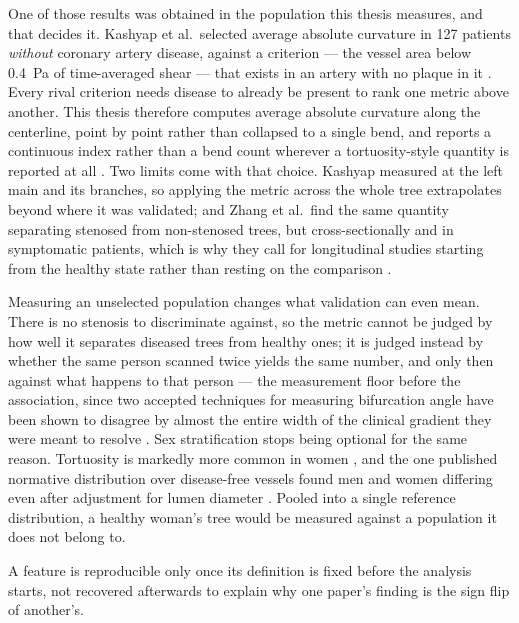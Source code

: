 One of those results was obtained in the population this thesis measures, and that decides it.
Kashyap et al.\ selected average absolute curvature in 127 patients \emph{without} coronary artery
disease, against a criterion --- the vessel area below 0.4~Pa of time-averaged shear --- that exists
in an artery with no plaque in it \cite{kashyap2022tortuosity}.
Every rival criterion needs disease to already be present to rank one metric above another.
This thesis therefore computes average absolute curvature along the centerline, point by point
rather than collapsed to a single bend, and reports a continuous index rather than a bend count
wherever a tortuosity-style quantity is reported at all \cite{zebicmihic2024index}.
Two limits come with that choice.
Kashyap measured at the left main and its branches, so applying the metric across the whole tree
extrapolates beyond where it was validated; and Zhang et al.\ find the same quantity separating
stenosed from non-stenosed trees, but cross-sectionally and in symptomatic patients, which is why
they call for longitudinal studies starting from the healthy state rather than resting on the
comparison \cite{zhang2024curvature}.

Measuring an unselected population changes what validation can even mean.
There is no stenosis to discriminate against, so the metric cannot be judged by how well it
separates diseased trees from healthy ones; it is judged instead by whether the same person scanned
twice yields the same number, and only then against what happens to that person --- the measurement
floor before the association, since two accepted techniques for measuring bifurcation angle have
been shown to disagree by almost the entire width of the clinical gradient they were meant to
resolve \cite{givehchi2018phantom}.
Sex stratification stops being optional for the same reason.
Tortuosity is markedly more common in women \cite{li2011tortuosity}, and the one published normative
distribution over disease-free vessels found men and women differing even after adjustment for lumen
diameter \cite{schultz2023ess}.
Pooled into a single reference distribution, a healthy woman's tree would be measured against a
population it does not belong to.

A feature is reproducible only once its definition is fixed before the analysis starts, not
recovered afterwards to explain why one paper's finding is the sign flip of another's.
